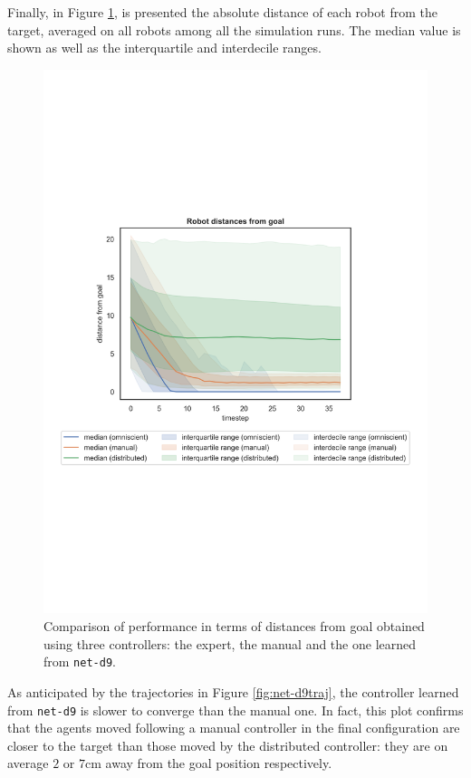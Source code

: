 Finally, in Figure \ref{fig:net-d9distance}, is presented the absolute distance of 
each robot from the target, averaged on all robots among all the simulation runs. 
The median value is shown as well as the interquartile and interdecile ranges.
\begin{figure}[!htb]
	\centering
	\includegraphics[width=.63\textwidth]{contents/images/net-d9/distances-from-goal-compressed-distributed}%
	\caption[Evaluation of \texttt{net-d9} distances from goal.]{Comparison of 
		performance in terms of distances from goal obtained using three 
		controllers: the expert, the manual and the one learned from \texttt{net-d9}.}
	\label{fig:net-d9distance}
\end{figure}
As anticipated by the trajectories in Figure \ref{fig:net-d9traj}, the controller 
learned from \texttt{net-d9} is slower to converge than the manual one. In fact, 
this plot confirms that the agents moved following a manual controller in the final 
configuration are closer to the target than those moved by the distributed 
controller: they are on average $2$ or $7$cm away from the goal position 
respectively.

